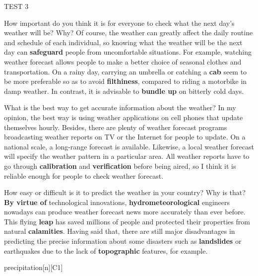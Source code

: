 \begin{glossarymc}[Cambridge 11]
\begin{test}{TEST 3}
    \begin{qa}{How important do you think it is for everyone to check what the next day’s weather will be? Why?}
    Of course, the weather can greatly affect the daily routine and schedule of each individual, so knowing what the weather will be the next day can \textbf{safeguard} people from uncomfortable situations. For example, watching weather forecast allows people to make a better choice of seasonal clothes and transportation. On a rainy day, carrying an umbrella or catching a \textbf{cab} seem to be more preferable so as to avoid \textbf{filthiness}, compared to riding a motorbike in damp weather. In contrast, it is advisable to \textbf{bundle up} on bitterly cold days.
    \end{qa}

    \begin{qa}{What is the best way to get accurate information about the weather?}
    In my opinion, the best way is using weather applications on cell phones that update themselves hourly. Besides, there are plenty of weather forecast programs broadcasting weather reports on TV or the Internet for people to update. On a national scale, a long-range forecast is available. Likewise, a local weather forecast will specify the weather pattern in a particular area. All weather reports have to go through \textbf{calibration} and \textbf{verification} before being aired, so I think it is reliable enough for people to check weather forecast.
    \end{qa}

    \begin{qa}{How easy or difficult is it to predict the weather in your country? Why is that?}
    \textbf{By virtue of} technological innovations, \textbf{hydrometeorological} engineers nowadays can produce weather forecast news more accurately than ever before. This flying \textbf{leap} has saved millions of people and protected their properties from natural \textbf{calamities}. Having said that, there are still major disadvantages in predicting the precise information about some disasters such as \textbf{landslides} or earthquakes due to the lack of \textbf{topographic} features, for example.
    \end{qa}

        \begin{VocabExplain}[Part 3]
            \begin{ExplainCard}{precipitation}[n][C1]
            \end{ExplainCard}


\end{VocabExplain}
\end{test}
\end{glossarymc}
